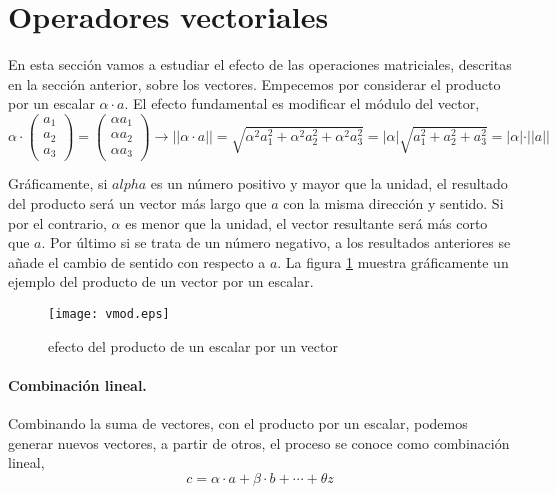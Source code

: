 \section{Operadores vectoriales}\label{opvect}
En esta sección vamos a estudiar el efecto de las operaciones matriciales, descritas en la sección anterior, sobre los vectores. Empecemos por considerar el producto por un escalar $\alpha \cdot a$. El efecto fundamental es modificar el módulo del vector,
\begin{equation*}
\alpha \cdot \begin{pmatrix}
a_1\\
a_2\\
a_3
\end{pmatrix}=
\begin{pmatrix}
\alpha a_1\\
\alpha a_2\\
\alpha a_3
\end{pmatrix}\rightarrow \vert \vert \alpha \cdot a \vert \vert =\sqrt{\alpha ^2a_1^2+\alpha ^2a_2^2+\alpha ^2a_3^2}=\vert \alpha \vert  \sqrt{a_1^2+a_2^2+a_3^2}=\vert \alpha \vert \cdot \vert \vert a \vert \vert
\end{equation*}

Gráficamente, si $alpha$ es un número positivo y mayor que la unidad, el resultado del producto será un vector más largo que $a$ con la misma dirección y sentido. Si por el contrario, $\alpha$ es menor que la unidad, el vector resultante será más corto que $a$. Por último si se trata de un número negativo, a los resultados anteriores se añade el cambio de sentido con respecto a $a$. La figura \ref{fig:vmod} muestra gráficamente un ejemplo  del producto de un vector por un escalar.

\begin{figure}[h]
\centering
\texttt{[image: vmod.eps]}
\caption{efecto del producto de un escalar por un vector}
\label{fig:vmod}
\end{figure}

\paragraph{Combinación lineal.} Combinando la suma de vectores, con el producto por un escalar, podemos generar nuevos vectores, a partir de otros, el proceso se conoce como combinación lineal,
\begin{equation*}
c=\alpha \cdot a + \beta \cdot b + \cdots +\theta z
\end{equation*}

